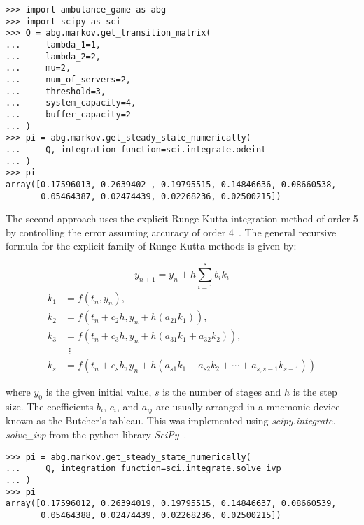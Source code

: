 \begin{lstlisting}[style=pystyle]
>>> import ambulance_game as abg
>>> import scipy as sci
>>> Q = abg.markov.get_transition_matrix(
...     lambda_1=1,
...     lambda_2=2,
...     mu=2,
...     num_of_servers=2,
...     threshold=3,
...     system_capacity=4,
...     buffer_capacity=2
... )
>>> pi = abg.markov.get_steady_state_numerically(
...     Q, integration_function=sci.integrate.odeint
... )
>>> pi
array([0.17596013, 0.2639402 , 0.19795515, 0.14846636, 0.08660538,
       0.05464387, 0.02474439, 0.02268236, 0.02500215])

\end{lstlisting}



The second approach uses the explicit Runge-Kutta integration method of order 5
by controlling the error assuming accuracy of order
4~\cite{solve_ivp_rk45_method, runge_kutta_formulas}.
The general recursive formula for the explicit family of Runge-Kutta methods is
given by:

\begin{equation}
    y_{n+1} = y_n + h \sum_{i=1}^s b_i k_i
\end{equation}
\begin{align}
    k_1 & = f(t_n, y_n), \nonumber \\
    k_2 & = f(t_n+c_2h, y_n+h(a_{21}k_1)), \nonumber \\
    k_3 & = f(t_n+c_3h, y_n+h(a_{31}k_1+a_{32}k_2)), \nonumber \\
        & \ \ \vdots \nonumber \\
    k_s & = f(t_n+c_s h, y_n+h(a_{s1}k_1+a_{s2}k_2+\cdots+a_{s,s-1}k_{s-1}))
    \nonumber
\end{align}

where \(y_0\) is the given initial value, \(s\) is the number of stages and
\(h\) is the step size.
The coefficients \(b_i\), \(c_i\), and \(a_{ij}\) are usually arranged in a
mnemonic device known as the Butcher's tableau.
This was implemented using \textit{scipy.integrate. solve\_ivp} from the python
library \textit{SciPy}~\cite{2020SciPy-NMeth}.

\begin{lstlisting}[style=pystyle]
>>> pi = abg.markov.get_steady_state_numerically(
...     Q, integration_function=sci.integrate.solve_ivp
... )
>>> pi
array([0.17596012, 0.26394019, 0.19795515, 0.14846637, 0.08660539,
       0.05464388, 0.02474439, 0.02268236, 0.02500215])

\end{lstlisting}


